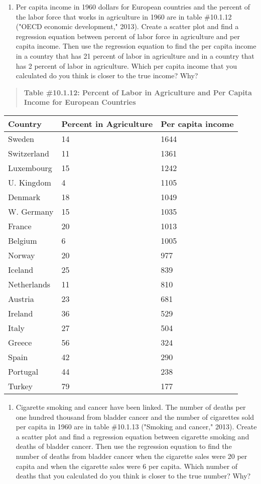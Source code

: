 \documentclass[]{book}
\providecommand{\tightlist}{%
  \setlength{\itemsep}{0pt}\setlength{\parskip}{0pt}}
\begin{document}
\begin{enumerate}
\def\labelenumi{\arabic{enumi}.}
\setcounter{enumi}{7}
\tightlist
\item
  Per capita income in 1960 dollars for European countries and the
  percent of the labor force that works in agriculture in 1960 are in
  table \#10.1.12 ("OECD economic development," 2013). Create a
  scatter plot and find a regression equation between percent of labor
  force in agriculture and per capita income. Then use the regression
  equation to find the per capita income in a country that has 21
  percent of labor in agriculture and in a country that has 2 percent
  of labor in agriculture. Which per capita income that you calculated
  do you think is closer to the true income? Why?
\end{enumerate}

\begin{quote}
\textbf{Table \#10.1.12: Percent of Labor in Agriculture and Per Capita
Income for European Countries}
\end{quote}

\begin{longtable}[]{@{}lll@{}}
\toprule
Country & Percent in Agriculture & Per capita income\tabularnewline
\midrule
\endhead
Sweden & 14 & 1644\tabularnewline
Switzerland & 11 & 1361\tabularnewline
Luxembourg & 15 & 1242\tabularnewline
U. Kingdom & 4 & 1105\tabularnewline
Denmark & 18 & 1049\tabularnewline
W. Germany & 15 & 1035\tabularnewline
France & 20 & 1013\tabularnewline
Belgium & 6 & 1005\tabularnewline
Norway & 20 & 977\tabularnewline
Iceland & 25 & 839\tabularnewline
Netherlands & 11 & 810\tabularnewline
Austria & 23 & 681\tabularnewline
Ireland & 36 & 529\tabularnewline
Italy & 27 & 504\tabularnewline
Greece & 56 & 324\tabularnewline
Spain & 42 & 290\tabularnewline
Portugal & 44 & 238\tabularnewline
Turkey & 79 & 177\tabularnewline
\bottomrule
\end{longtable}

\begin{enumerate}
\def\labelenumi{\arabic{enumi}.}
\setcounter{enumi}{8}
\tightlist
\item
  Cigarette smoking and cancer have been linked. The number of deaths
  per one hundred thousand from bladder cancer and the number of
  cigarettes sold per capita in 1960 are in table \#10.1.13 ("Smoking
  and cancer," 2013). Create a scatter plot and find a regression
  equation between cigarette smoking and deaths of bladder cancer.
  Then use the regression equation to find the number of deaths from
  bladder cancer when the cigarette sales were 20 per capita and when
  the cigarette sales were 6 per capita. Which number of deaths that
  you calculated do you think is closer to the true number? Why?
\end{enumerate}
\end{document}
